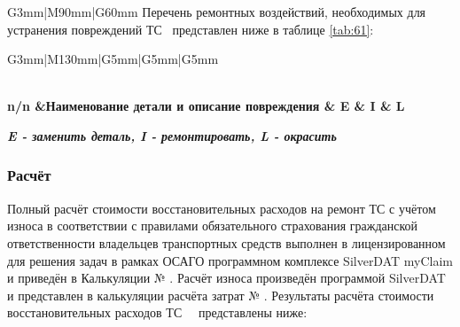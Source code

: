 \begin{longtable}{G{3mm}|M{90mm}|G{60mm}}
	Перечень ремонтных воздействий, необходимых для устранения повреждений ТС \, представлен ниже в таблице \ref{tab:61}:\\
	
	\setcounter{rownum}{0}
	
	\begin{longtable}{G{3mm}|M{130mm}|G{5mm}|G{5mm}|G{5mm}}
		\caption[]{Ремонтные воздействия, необходимые для устранения повреждений ТС }
		\label{tab:61}\\
		\hline  \hline   \toprule 
		\bf  {\footnotesize  n/n}  &\bf {\small Наименование  детали и описание повреждения} & \bf {\small E} & \bf {\small I} & \bf {\small L}\\\hline \hline \toprule  \endhead 
		
		 
		
		\textbf{\textit{E - заменить деталь, I - ремонтировать, L - окрасить} }
		
		
		\renewcommand\baselinestretch{1.2}\small\normalsize 
		\subsubsection{ Расчёт}
		
		\indent Полный расчёт стоимости восстановительных расходов на ремонт ТС с учётом износа в соответствии с правилами обязательного страхования гражданской ответственности владельцев транспортных средств выполнен в  лицензированном для решения задач в рамках ОСАГО программном комплексе   SilverDAT myClaim и приведён в Калькуляции № \NomerDoc.
		Расчёт износа произведён программой  SilverDAT и представлен  в калькуляции расчёта затрат № \NomerDoc.
		\indent Результаты расчёта  стоимости восстановительных расходов ТС \, \, представлены ниже:\\
		

\end{longtable}
\end{longtable}
